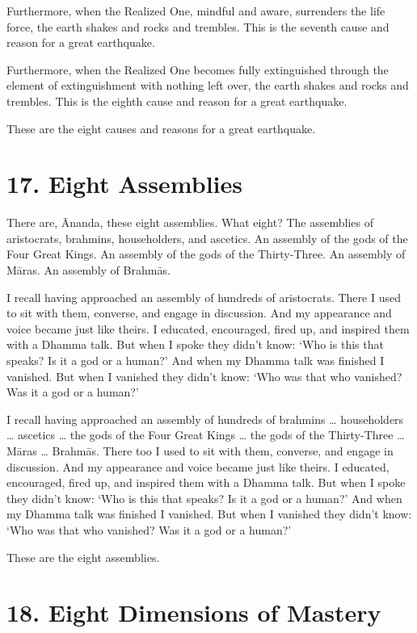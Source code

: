 \documentclass[12pt,openany]{book}%
\begin{document}
Furthermore, when the Realized One, mindful and aware, surrenders the life force, the earth shakes and rocks and trembles. This is the seventh cause and reason for a great earthquake. 

Furthermore, when the Realized One becomes fully extinguished through the element of extinguishment with nothing left over, the earth shakes and rocks and trembles. This is the eighth cause and reason for a great earthquake. 

These are the eight causes and reasons for a great earthquake. 

\section*{17. Eight Assemblies }

There are, Ānanda, these eight assemblies. What eight? The assemblies of aristocrats, brahmins, householders, and ascetics. An assembly of the gods of the Four Great Kings. An assembly of the gods of the Thirty-Three. An assembly of \textsanskrit{Māras}. An assembly of \textsanskrit{Brahmās}. 

I recall having approached an assembly of hundreds of aristocrats. There I used to sit with them, converse, and engage in discussion. And my appearance and voice became just like theirs. I educated, encouraged, fired up, and inspired them with a Dhamma talk. But when I spoke they didn’t know: ‘Who is this that speaks? Is it a god or a human?’ And when my Dhamma talk was finished I vanished. But when I vanished they didn’t know: ‘Who was that who vanished? Was it a god or a human?’ 

I recall having approached an assembly of hundreds of brahmins … householders … ascetics … the gods of the Four Great Kings … the gods of the Thirty-Three … \textsanskrit{Māras} … \textsanskrit{Brahmās}. There too I used to sit with them, converse, and engage in discussion. And my appearance and voice became just like theirs. I educated, encouraged, fired up, and inspired them with a Dhamma talk. But when I spoke they didn’t know: ‘Who is this that speaks? Is it a god or a human?’ And when my Dhamma talk was finished I vanished. But when I vanished they didn’t know: ‘Who was that who vanished? Was it a god or a human?’ 

These are the eight assemblies. 

\section*{18. Eight Dimensions of Mastery }
\end{document}
